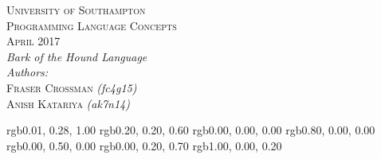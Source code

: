\documentclass{article}
\begin{document}
\begin{center} 
    \textsc{\large University of Southampton}       \\[1.5cm]
    \textsc{\LARGE Programming Language Concepts}   \\[0.5cm]
    \textsc{\normalsize April 2017}                 \\[3.0cm]
    
    \emph{  \large Bark of the Hound Language}      \\[0.5cm]
    \emph{  \large Authors:}                        \\
    
    \textsc{Fraser Crossman} \emph{(fc4g15)}        \\
    \textsc{Anish Katariya} \emph{(ak7n14)}         \\
\end{center}

\newpage

\tableofcontents

\newpage


\definecolor{variable}  {rgb}{0.01, 0.28, 1.00}
\definecolor{type}      {rgb}{0.20, 0.20, 0.60}
\definecolor{operator}  {rgb}{0.00, 0.00, 0.00}
\definecolor{stringlit} {rgb}{0.80, 0.00, 0.00}
\definecolor{comment}   {rgb}{0.00, 0.50, 0.00}
\definecolor{token}     {rgb}{0.00, 0.20, 0.70}
\definecolor{error}     {rgb}{1.00, 0.00, 0.20}



\newcommand{\variable}  [1]{\textcolor{variable}    {#1} } 
\newcommand{\type}      [1]{\textcolor{type}        {#1} }
\newcommand{\operator}  [1]{\textcolor{operator}    {#1} }
\newcommand{\stringlit} [1]{\textcolor{stringlit}   {#1} }
\newcommand{\comment}   [1]{\textcolor{comment}     {#1} }
\newcommand{\token}     [1]{\textcolor{token}       {#1} }
\newcommand{\error}     [1]{\textcolor{error}       {#1} }


\newcommand{\program}[1]{
    \noindent\texttt{#1}
}
\newcommand{\tab}[1]{\hskip 3em #1}

\newcommand{\BEGIN}{\token {begin}}
\newcommand{\END}{\token {end}}
\newcommand{\INPUT}[1]{\variable {args#1}}
\newcommand{\OC}{\variable {OUTPUT\_COUNT}}
\newcommand{\ES}{\variable {\_\_empty\_string}}
\end{document}
